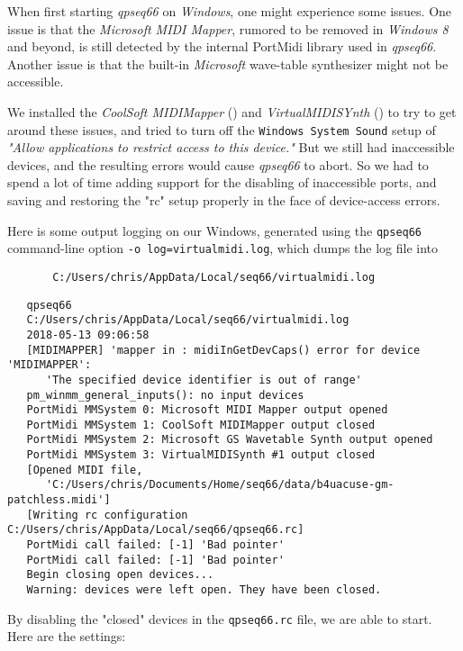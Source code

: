     When first starting \textsl{qpseq66} on \textsl{Windows}, one might
    experience some issues.  One issue is that the \textsl{Microsoft MIDI
    Mapper}, rumored to be removed in \textsl{Windows 8} and beyond, is still
    detected by the internal PortMidi library used in \textsl{qpseq66}.
    Another issue is that the built-in \textsl{Microsoft} wave-table
    synthesizer might not be accessible.

    We installed the
    \textsl{CoolSoft MIDIMapper} (\cite{midimapper}) and
    \textsl{VirtualMIDISYnth} (\cite{midisynth}) to try to get
    around these issues, and tried to turn off the
    \texttt{Windows System Sound} setup of
    \textsl{"Allow applications to restrict access to this device."}
    But we still had
    inaccessible devices, and the resulting errors would cause
    \textsl{qpseq66} to
    abort.  So we had to spend a lot of time adding support for
    the disabling of
    inaccessible ports, and saving and restoring the "rc" setup properly
    in the face of device-access errors.

    Here is some output logging on our Windows, generated using the
    \texttt{qpseq66} command-line option
    \texttt{-o log=virtualmidi.log}, which dumps the log file into

   \begin{verbatim}
       C:/Users/chris/AppData/Local/seq66/virtualmidi.log
   \end{verbatim}

\begin{verbatim}
   qpseq66 
   C:/Users/chris/AppData/Local/seq66/virtualmidi.log 
   2018-05-13 09:06:58 
   [MIDIMAPPER] 'mapper in : midiInGetDevCaps() error for device 'MIDIMAPPER':
      'The specified device identifier is out of range'
   pm_winmm_general_inputs(): no input devices
   PortMidi MMSystem 0: Microsoft MIDI Mapper output opened
   PortMidi MMSystem 1: CoolSoft MIDIMapper output closed
   PortMidi MMSystem 2: Microsoft GS Wavetable Synth output opened
   PortMidi MMSystem 3: VirtualMIDISynth #1 output closed
   [Opened MIDI file,
      'C:/Users/chris/Documents/Home/seq66/data/b4uacuse-gm-patchless.midi']
   [Writing rc configuration C:/Users/chris/AppData/Local/seq66/qpseq66.rc]
   PortMidi call failed: [-1] 'Bad pointer'
   PortMidi call failed: [-1] 'Bad pointer'
   Begin closing open devices...
   Warning: devices were left open. They have been closed.
\end{verbatim}

    By disabling the "closed" devices in the \texttt{qpseq66.rc} file,
    we are able to start.  Here are the settings:

